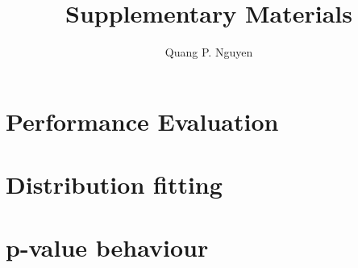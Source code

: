 \documentclass{article}
\author{Quang P. Nguyen}
\title{Supplementary Materials}
\begin{document}
\maketitle
{}

\section{Performance Evaluation} 
\section{Distribution fitting}
\section{p-value behaviour}

\newpage
{}

\end{document}
